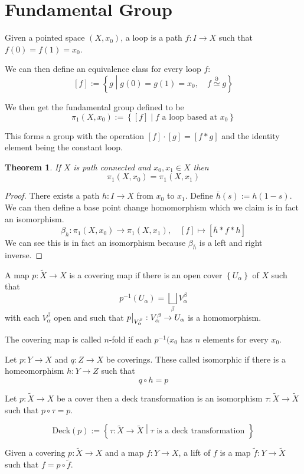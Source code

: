 \documentclass[11pt]{article}
\newcommand{\defeq}{:=}
\newcommand{\homrel}{\stackrel{\partial}{\simeq}}
\newcommand\restr[2]{{%
  \left.\kern-\nulldelimiterspace %
  #1 %
  \vphantom{\big|} %
  \right|_{#2} %
  }}
\newcommand{\relmiddle}[1]{\mathrel{}\middle#1\mathrel{}}
\newcommand{\rmv}{\relmiddle|}
\newenvironment{defin}
	{\begin{mdframed}[backgroundcolor=white, roundcorner=5pt, linewidth=1pt]}
	{\end{mdframed}}
\newcommand{\mdf}[1]{{\color{red} #1}}
\newtheorem{theorem}{Theorem}[section]
\begin{document}
\section{Fundamental Group}
\begin{defin}
	Given a pointed space $(X,x_0)$, a \mdf{loop} is a path $f:I \to X$ such that $f(0)=f(1)=x_0$.	

	We can then define an equivalence class for every loop $f$:
	\[
		[f]\defeq\left\{g \rmv g(0)=g(1)=x_0,\quad f\homrel g \right\}
	\]
	
	We then get the \mdf{fundamental group} defined to be
	\[
		\pi_1(X,x_0)\defeq\left\{[f] \rmv f \text{ a loop based at } x_0 \right\}
	\]

	This forms a group with the operation $[f]\cdot [g]=[f\ast g]$ and the identity element being the constant loop.
\end{defin}

\begin{theorem}
If $X$ is path connected and $x_0,x_1\in X$ then
\[
	\pi_1(X,x_0)=\pi_1(X,x_1)
\]
\end{theorem}

\begin{proof}
There exists a path $h:I\to X$ from $x_0$ to $x_1$.
Define $\overline{h}(s)\defeq h(1-s)$.
We can then define a base point change homomorphism which we claim is in fact an isomorphism.
\[
	\beta_h:\pi_1(X,x_0)\to\pi_1(X,x_1), \quad [f]\mapsto [\overline{h}\ast f \ast h]
\]
We can see this is in fact an isomorphism because $\beta_{\overline{h}}$ is a left and right inverse.
\end{proof}

\begin{defin}
	A map $p:\widetilde{X}\to X$ is a \mdf{covering map} if there is an open cover $\left\{U_\alpha\right\}$ of $X$ such that
	\[
		p^{-1}(U_\alpha)=\bigsqcup_\beta V_\alpha^\beta
	\]
	with each $V_\alpha^\beta$ open and such that $\restr{p}{V_\alpha^\beta}:V_\alpha^\beta\to U_\alpha$ is a homomorphism.

	The covering map is called \mdf{$n$-fold} if each $p^{-1}(x_0$ has $n$ elements for every $x_0$.

	Let $p:Y\to X$ and $q:Z\to X$ be coverings. These called \mdf{isomorphic} if there is a homeomorphism $h:Y\to Z$ such that
	\[
		q \circ h = p
	\]

	Let $p:\widetilde{X}\to X$ be a cover then a \mdf{deck transformation} is an isomorphism $\tau:\widetilde{X}\to\widetilde{X}$ such that $p\circ\tau=p$.

	\[
		\text{Deck}(p)\defeq\left\{\tau:\widetilde{X}\to\widetilde{X}\rmv\tau\text{ is a deck transformation }\right\}
	\]

	Given a covering $p:\widetilde{X}\to X$ and a map $f:Y\to X$, a \mdf{lift} of $f$ is a map $\widetilde{f}:Y\to\widetilde{X}$ such that $f=p\circ\widetilde{f}$.
\end{defin}
\end{document}
